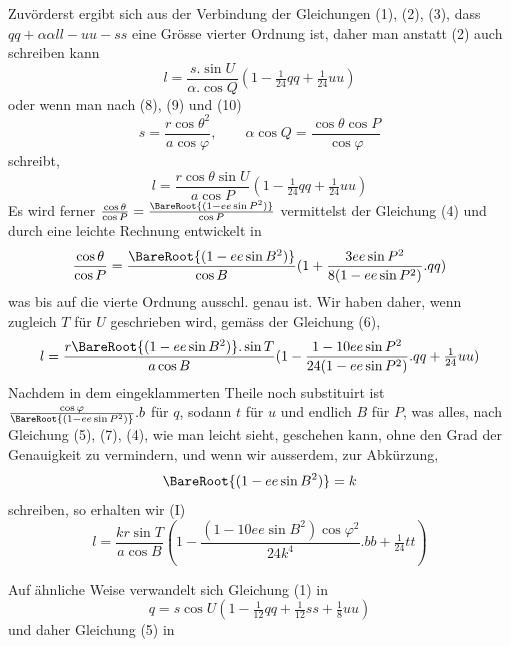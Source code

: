 %
\par\noindent\hspace*{\parindent} Zuvörderst ergibt sich aus der Verbindung der Gleichungen (1), (2), (3), dass \(qq+\alpha\alpha ll-uu-ss\) eine Grösse vierter Ordnung ist, daher man anstatt (2) auch schreiben kann
\[
l=\frac{s\mathord{.}\sin U}{\alpha\mathord{.}\cos Q}(1-\tfrac1{24}qq+\tfrac1{24}uu)
\]
oder wenn man nach (8), (9) und (10)
\[
s=\frac{r\cos\theta^2}{a\cos\varphi},\qquad \alpha\cos Q=\frac{\cos\theta\cos P}{\cos\varphi}
\]
schreibt,
\[
l=\frac{r\cos\theta\sin U}{a\cos P}(1-\tfrac1{24}qq+\tfrac1{24}uu)
\]
Es wird ferner \(\frac{\cos\theta}{\cos P}=\frac{\BareRoot{(1-ee\sin P^2)}}{\cos P}\) vermittelst der Gleichung (4) und durch eine leichte Rechnung entwickelt in
\[
\frac{\cos\theta}{\cos P}=\frac{\BareRoot{(1-ee\sin B^2)}}{\cos B}(1+\frac{3ee\sin P^2}{8(1-ee\sin P^2)}\mathord{.}qq)
\]
was bis auf die vierte Ordnung ausschl. genau ist. Wir haben daher, wenn zugleich \(T\) für \(U\) geschrieben wird, gemäss der Gleichung (6),
\[
l=\frac{r\BareRoot{(1-ee\sin B^2)}\mathord{.}\sin T}{a\cos B}(1-\frac{1-10ee\sin P^2}{24(1-ee\sin P^2)}\mathord{.}qq+\tfrac1{24}uu)
\]
Nachdem in dem eingeklammerten Theile noch substituirt ist \(\frac{\cos\varphi}{\BareRoot{(1-ee\sin P^2)}}\mathord{.}b\) für \(q\), sodann \(t\) für \(u\) und endlich \(B\) für \(P\), was alles, nach Gleichung (5), (7), (4), wie man leicht sieht, geschehen kann, ohne den Grad der Genauigkeit zu vermindern, und wenn wir ausserdem, zur Abkürzung,
\[
\BareRoot{(1-ee\sin B^2)}=k
\]
schreiben, so erhalten wir (I)
\[
l=\frac{kr\sin T}{a\cos B}(1-\frac{(1-10ee\sin B^2)\cos\varphi^2}{24k^4}\mathord{.}bb+\tfrac1{24}tt)
\]

Auf ähnliche Weise verwandelt sich Gleichung (1) in
\[
q=s\cos U(1-\tfrac1{12}qq+\tfrac1{12}ss+\tfrac18uu)
\]
und daher Gleichung (5) in
